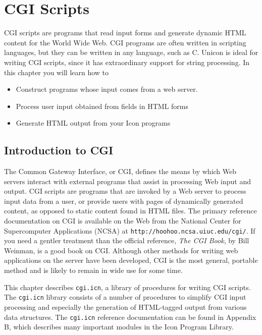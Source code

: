 \chapter{CGI Scripts}

CGI scripts are programs that read input forms and generate
dynamic HTML content for the World Wide
Web. CGI programs are often written in scripting
languages, but they can be written in any language, such as C.
Unicon is ideal for writing CGI scripts, since it
has extraordinary support for string processing. In this chapter you
will learn how to

\begin{itemize}
\item Construct programs whose input comes from a web server.
\item Process user input obtained from fields in HTML forms
\item Generate HTML output from your Icon programs
\end{itemize}

\section{Introduction to CGI}

The Common Gateway Interface, or CGI, defines the means by which Web
servers interact with external programs that assist in processing Web
input and output. CGI scripts are programs that are invoked by a Web
server to process input data from a user, or provide users with pages
of dynamically generated content, as opposed to static content found in
HTML files. The primary
reference documentation on CGI is
available on the Web from the National Center for Supercomputer
Applications (NCSA) at \texttt{http://hoohoo.ncsa.uiuc.edu/cgi/}. If
you need a gentler treatment than the official reference, \textit{The
CGI Book}, by Bill Weinman, is a good book on CGI. Although other
methods for writing web applications on the server have been developed,
CGI is the most general, portable method and is likely to remain in
wide use for some time.

This chapter describes \texttt{cgi.icn}, a library of procedures for
writing CGI scripts. The \texttt{cgi.icn} library consists of a number
of procedures to simplify CGI input processing and especially the
generation of HTML-tagged output from various data structures. The
\texttt{cgi.icn} reference documentation can be found in Appendix B,
which describes many important modules in the Icon Program Library.

